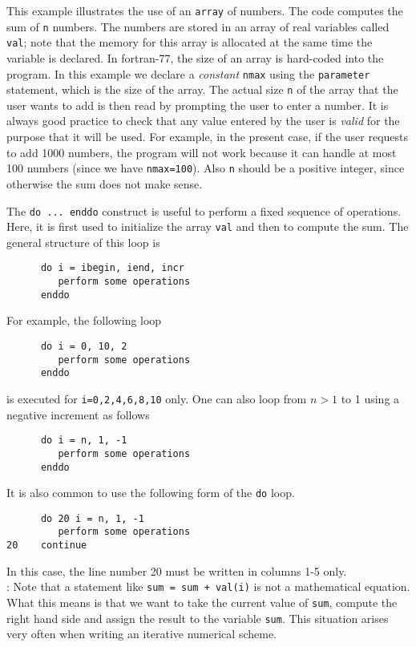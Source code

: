\documentclass[11pt,oneside]{amsart}
\begin{document}
This example illustrates the use of an {\tt array} of numbers. The code computes the sum of {\tt n} numbers. The numbers are stored in an array of real variables called {\tt val}; note that the memory for this array is allocated at the same time the variable is declared. In fortran-77, the size of an array is hard-coded into the program. In this example we declare a {\em constant} {\tt nmax} using the {\tt parameter} statement, which is the size of the array. The actual size {\tt n} of the array that the user wants to add is then read by prompting the user to enter a number. It is always good practice to check that any value entered by the user is {\em valid} for the purpose that it will be used. For example, in the present case, if the user requests to add 1000 numbers, the program will not work because it can handle at most 100 numbers (since we have {\tt nmax=100}). Also {\tt n} should be a positive integer, since otherwise the sum does not make sense.

The {\tt do ... enddo} construct is useful to perform a fixed sequence of operations. Here, it is first used to initialize the array {\tt val} and then to compute the sum. The general structure of this loop is
\begin{verbatim}
      do i = ibegin, iend, incr
         perform some operations
      enddo
\end{verbatim}
For example, the following loop
\begin{verbatim}
      do i = 0, 10, 2
         perform some operations
      enddo
\end{verbatim}
is executed for {\tt i=0,2,4,6,8,10} only. One can also loop from $n>1$ to 1 using a negative increment as follows
\begin{verbatim}
      do i = n, 1, -1
         perform some operations
      enddo
\end{verbatim}
It is also common to use the following form of the {\tt do} loop.
\begin{verbatim}
      do 20 i = n, 1, -1
         perform some operations
20    continue
\end{verbatim}
In this case, the line number 20 must be written in columns 1-5 only.\\

: Note that a statement like {\tt sum = sum + val(i)} is not a mathematical equation. What this means is that we want to take the current value of {\tt sum}, compute the right hand side and assign the result to the variable {\tt sum}. This situation arises very often when writing an iterative numerical scheme.
\end{document}
